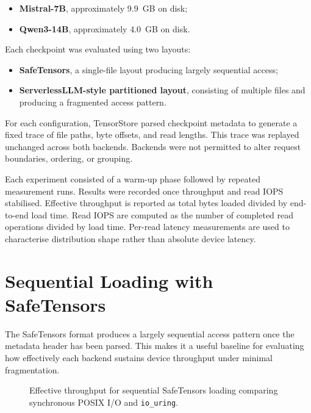 \documentclass[]{final_report}
\begin{document}
\begin{itemize}
    \item \textbf{Mistral-7B}, approximately 9.9~GB on disk;
    \item \textbf{Qwen3-14B}, approximately 4.0~GB on disk.
\end{itemize}

Each checkpoint was evaluated using two layouts:

\begin{itemize}
    \item \textbf{SafeTensors}, a single-file layout producing largely sequential access;
    \item \textbf{ServerlessLLM-style partitioned layout}, consisting of multiple files and producing a fragmented access pattern.
\end{itemize}

For each configuration, TensorStore parsed checkpoint metadata to generate a fixed trace of file paths, byte offsets, and read lengths. This trace was replayed unchanged across both backends. Backends were not permitted to alter request boundaries, ordering, or grouping.

Each experiment consisted of a warm-up phase followed by repeated measurement runs. Results were recorded once throughput and read IOPS stabilised. Effective throughput is reported as total bytes loaded divided by end-to-end load time. Read IOPS are computed as the number of completed read operations divided by load time. Per-read latency measurements are used to characterise distribution shape rather than absolute device latency.

\section{Sequential Loading with SafeTensors}

The SafeTensors format produces a largely sequential access pattern once the metadata header has been parsed. This makes it a useful baseline for evaluating how effectively each backend sustains device throughput under minimal fragmentation.

\begin{figure}[h]
\centering
{}
\caption{Effective throughput for sequential SafeTensors loading comparing synchronous POSIX I/O and \texttt{io\_uring}.}
\label{fig:st-throughput-mistral-eval}
\end{figure}
\end{document}
